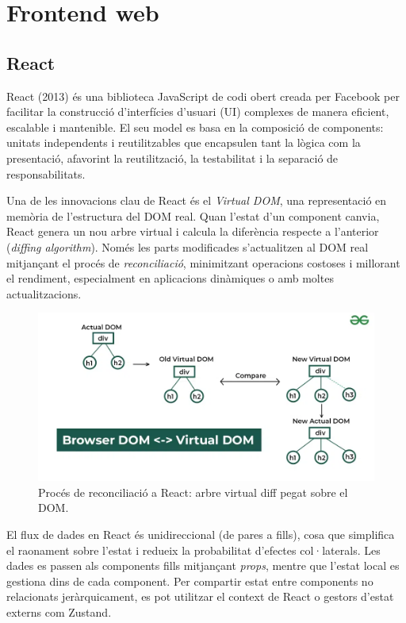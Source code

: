 \section{Frontend web}

\subsection*{React}
React (2013) és una biblioteca JavaScript de codi obert creada per Facebook per facilitar la construcció d'interfícies d'usuari (UI) complexes de manera eficient, escalable i mantenible. El seu model es basa en la composició de components: unitats independents i reutilitzables que encapsulen tant la lògica com la presentació, afavorint la reutilització, la testabilitat i la separació de responsabilitats.

Una de les innovacions clau de React és el \emph{Virtual DOM}, una representació en memòria de l'estructura del DOM real. Quan l'estat d'un component canvia, React genera un nou arbre virtual i calcula la diferència respecte a l'anterior (\emph{diffing algorithm}). Només les parts modificades s'actualitzen al DOM real mitjançant el procés de \emph{reconciliació}, minimitzant operacions costoses i millorant el rendiment, especialment en aplicacions dinàmiques o amb moltes actualitzacions.

\begin{figure}[H]
\centering
\includegraphics[width=0.9\linewidth]{Figures/Browser-DOM-Virtual-DOM.png}
\caption{Procés de reconciliació a React: arbre virtual \textrightarrow{} diff \textrightarrow{} pegat sobre el DOM.}
\label{fig:react-virtual-dom}
\end{figure}

El flux de dades en React és unidireccional (de pares a fills), cosa que simplifica el raonament sobre l'estat i redueix la probabilitat d'efectes col·laterals. Les dades es passen als components fills mitjançant \emph{props}, mentre que l'estat local es gestiona dins de cada component. Per compartir estat entre components no relacionats jeràrquicament, es pot utilitzar el context de React o gestors d'estat externs com Zustand.

